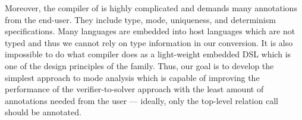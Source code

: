 Moreover, the compiler of \merc is highly complicated and demands many annotations from the end-user.
They include type, mode, uniqueness, and determinism specifications.
Many \mk languages are embedded into host languages which are not typed and thus we cannot rely on type information in our conversion.
It is also impossible to do what \merc compiler does as a light-weight embedded DSL which is one of the design principles of the \mk family.
Thus, our goal is to develop the simplest approach to mode analysis which is capable of improving the performance of the verifier-to-solver approach with the least amount of annotations needed from the user --- ideally, only the top-level relation call should be annotated.

% 


